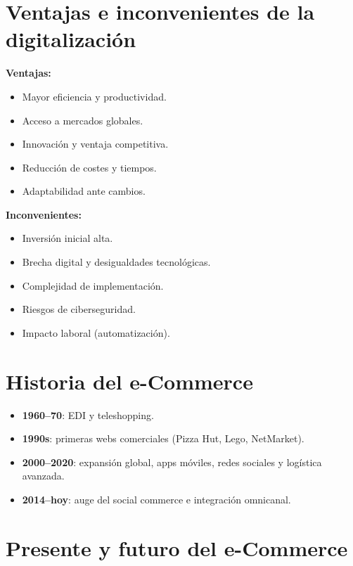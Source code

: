 \documentclass[11pt,a4paper]{article}
\begin{document}
\section{Ventajas e inconvenientes de la digitalización}

\begin{ChecklistBox}
\textbf{Ventajas:}
\begin{itemize}
	\item Mayor eficiencia y productividad.
	\item Acceso a mercados globales.
	\item Innovación y ventaja competitiva.
	\item Reducción de costes y tiempos.
	\item Adaptabilidad ante cambios.
\end{itemize}

\vspace{0.5em}
\textbf{Inconvenientes:}
\begin{itemize}
	\item Inversión inicial alta.
	\item Brecha digital y desigualdades tecnológicas.
	\item Complejidad de implementación.
	\item Riesgos de ciberseguridad.
	\item Impacto laboral (automatización).
\end{itemize}
\end{ChecklistBox}

\section{Historia del e-Commerce}
\begin{itemize}
	\item \textbf{1960–70}: EDI y teleshopping.
	\item \textbf{1990s}: primeras webs comerciales (Pizza Hut, Lego, NetMarket).
	\item \textbf{2000–2020}: expansión global, apps móviles, redes sociales y logística avanzada.
	\item \textbf{2014–hoy}: auge del social commerce e integración omnicanal.
\end{itemize}

\section{Presente y futuro del e-Commerce}
\end{document}
